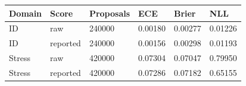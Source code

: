 \begin{tabular}{llllll}
\toprule
Domain & Score & Proposals & ECE & Brier & NLL \\
\midrule
ID & raw & 240000 & 0.00180 & 0.00277 & 0.01226 \\
ID & reported & 240000 & 0.00156 & 0.00298 & 0.01193 \\
Stress & raw & 420000 & 0.07304 & 0.07047 & 0.79950 \\
Stress & reported & 420000 & 0.07286 & 0.07182 & 0.65155 \\
\bottomrule
\end{tabular}
